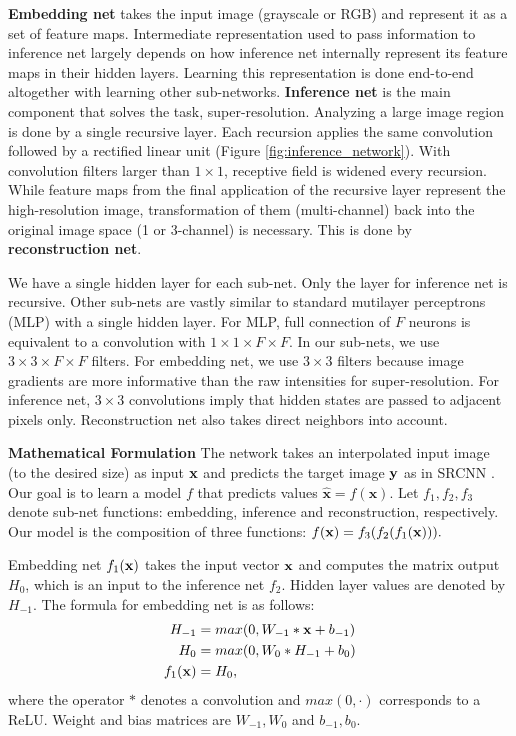 \documentclass[10pt,twocolumn,letterpaper]{article}
\begin{document}
\textbf{Embedding net} takes the input image (grayscale or RGB) and represent it as a set of feature maps. Intermediate representation used to pass information to inference net largely depends on how inference net internally represent its feature maps in their hidden layers. Learning this representation is done end-to-end altogether with learning other sub-networks. \textbf{Inference net} is the main component that solves the task, super-resolution. Analyzing a large image region is done by a single recursive layer. Each recursion applies the same convolution followed by a rectified linear unit (Figure \ref{fig:inference_network}). With convolution filters larger than $1\times 1$,  receptive field is widened every recursion. While feature maps from the final application of the recursive layer represent the high-resolution image, transformation of them (multi-channel) back into the original image space (1 or 3-channel) is necessary. This is done by \textbf{reconstruction net}.  

We have a single hidden layer for each sub-net. Only the layer for inference net is recursive. Other sub-nets are vastly similar to standard mutilayer perceptrons (MLP) with a single hidden layer. For MLP, full connection of $F$ neurons is equivalent to a convolution with $1\times 1\times F \times F$. In our sub-nets, we use $3\times 3\times F \times F$ filters. For embedding net, we use $3\times 3$ filters because image gradients are more informative than the raw intensities for super-resolution. For inference net, $3\times 3$ convolutions imply that hidden states are passed to adjacent pixels only. Reconstruction net also takes direct neighbors into account.

\textbf{Mathematical Formulation} The network takes an interpolated input image (to the desired size) as input ${\bf x}$ and predicts the target image ${\bf y}$ as in SRCNN \cite{dong2014image}. Our goal is to learn a model $f$ that predicts values $\mathbf{\hat{x}}=f(\mathbf{x})$. Let $f_1, f_2, f_3$ denote sub-net functions: embedding, inference and reconstruction, respectively. Our model is the composition of three functions: $f({\bf x}) = f_3(f_2 (f_1({\bf x}))).$
 
 Embedding net $f_1({\bf x})$ takes the input vector ${\bf x}$ and computes the matrix output $H_0$, which is an input to the inference net $f_2$. Hidden layer values are denoted by $H_{-1}$. The formula for embedding net is as follows:
  \begin{align}
        H_{-1} &= max(0, W_{-1}*{\bf x} + b_{-1})\\
        H_0 &= max(0, W_{0}*H_{-1} + b_0)\\
        f_1({\bf x}) &= H_0,
    \end{align}
where the operator $*$ denotes a convolution and $max(0,\cdot)$ corresponds to a ReLU. Weight and bias matrices are $W_{-1},W_0$ and $b_{-1},b_0$.
\end{document}
